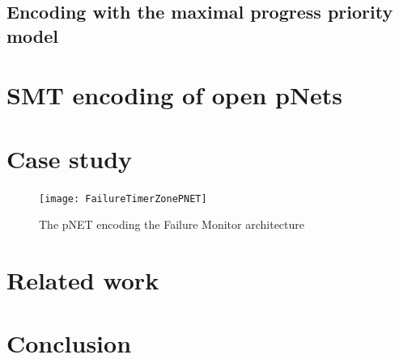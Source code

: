 \documentclass{llncs}
\begin{document}
\subsection{Encoding with the maximal progress priority model}
\label{secn:enc:maxprog}




\section{SMT encoding of open pNets}
\label{secn:smt}


\section{Case study}
\label{secn:case-study}

\begin{figure}[t]
  \centering
  \texttt{[image: FailureTimerZonePNET]}
  \caption{The pNET encoding the Failure Monitor architecture}
  \label{schema:ArchFailure:BIP}
\end{figure}



\section{Related work}
\label{secn:related}


\section{Conclusion}
\label{secn:conclusion}




\end{document}
